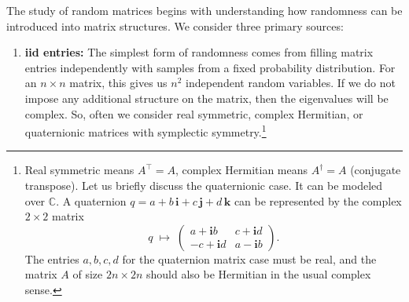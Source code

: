 \documentclass[letterpaper,11pt,oneside,reqno]{book}
\numberwithin{equation}{chapter}  %
\theoremstyle{definition}
\begin{document}
The study of random matrices begins with understanding how randomness can be introduced into matrix structures. We consider three primary sources:
\begin{enumerate}
\item \textbf{iid entries:}
The simplest form of randomness comes from filling matrix entries independently with samples from a fixed probability distribution. For an $n \times n$ matrix, this gives us $n^2$ independent random variables.
If we do not impose any additional structure on the matrix, then the eigenvalues
will be complex. So, often we consider real symmetric, complex Hermitian, or quaternionic matrices with
symplectic symmetry.\footnote{Real symmetric means $A^\top=A$, complex Hermitian means $A^\dagger=A$ (conjugate transpose).
	Let us briefly discuss the quaternionic case. It can be modeled over $\mathbb{C}$. A quaternion
	$q = a + b\,\mathbf{i} + c\,\mathbf{j} + d\,\mathbf{k}$
	can be represented by the complex $2\times 2$ matrix
	\[
	q \;\longmapsto\;
	\begin{pmatrix}
	a + \mathbf{i}b & c + \mathbf{i}d \\
	-c + \mathbf{i}d & a - \mathbf{i}b
	\end{pmatrix}.
	\]
	The entries $a,b,c,d$ for the quaternion matrix case must be real, and the matrix
$A$ of size $2n\times 2n$ should also be Hermitian in the usual complex sense.\label{lecture1:fn:quaternion}}



\end{enumerate}
\end{document}
